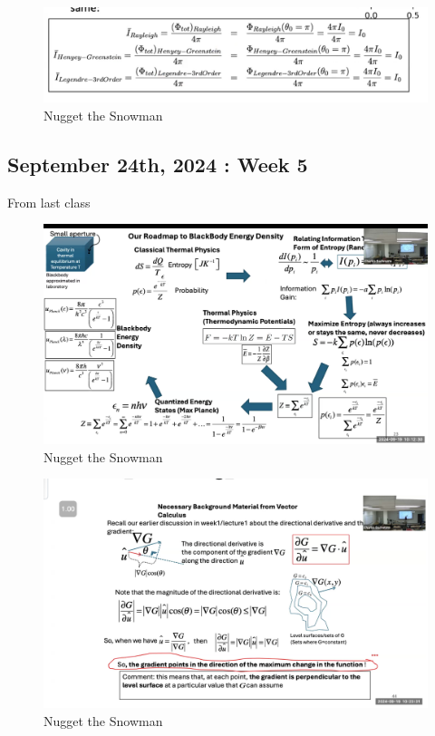 \documentclass{article}
\begin{document}
\begin{figure}[h!]
\centering
\includegraphics[scale=.2]{Radiometry/Week4/Notes/PSET2/P5/Num10.png}
\caption{Nugget the Snowman}
\label{fig:Greenstein}
\end{figure}
\clearpage

\subsection{ September 24th, 2024 : Week 5}

From last class 

\begin{figure}[h!]
\centering
\includegraphics[scale=.3]{Radiometry/Week4/Notes/PSET2/BlackbodyIMP.png}
\caption{Nugget the Snowman}
\label{fig:Blackbody}
\end{figure}


\begin{figure}[h!]
\centering
\includegraphics[scale=.6]{Radiometry/Week4/Notes/PSET2/Gradiant.png}
\caption{Nugget the Snowman}
\label{fig:Blackbody}
\end{figure}
\clearpage
\end{document}
